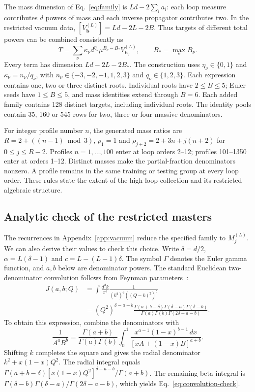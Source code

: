 The mass dimension of Eq.~\eqref{eq:family} is $Ld-2\sum_i a_i$: each loop measure contributes $d$ powers of mass and each inverse propagator contributes two. In the restricted vacuum data, $[V_{\boldsymbol b}^{(L)}]=Ld-2L-2B$. Thus targets of different total powers can be combined consistently as
\begin{equation}
 T=\sum_\nu \kappa_\nu d^{\eta_\nu}\mu^{B_\nu-B_*}
 V_{\boldsymbol b_\nu}^{(L)},\qquad B_*=\max_\nu B_\nu.
 \label{eq:weighted-target}
\end{equation}
Every term has dimension $Ld-2L-2B_*$. The construction uses $\eta_\nu\in\{0,1\}$ and $\kappa_\nu=n_\nu/q_\nu$, with $n_\nu\in\{-3,-2,-1,1,2,3\}$ and $q_\nu\in\{1,2,3\}$. Each expression contains one, two or three distinct roots. Individual roots have $2\leq B\leq5$; Euler seeds have $1\leq B\leq5$, and mass identities extend through $B=6$. Each added family contains 128 distinct targets, including individual roots. The identity pools contain 35, 160 or 545 rows for two, three or four massive denominators.

For integer profile number $n$, the generated mass ratios are $R=2+((n-1)\bmod3)$, $\rho_1=1$ and $\rho_{j+2}=2+3n+j(n+2)$ for $0\leq j\leq R-2$. Profiles $n=1,\ldots,100$ enter at loop orders 2--12; profiles 101--1350 enter at orders 1--12. Distinct masses make the partial-fraction denominators nonzero. A profile remains in the same training or testing group at every loop order. These rules state the extent of the high-loop collection and its restricted algebraic structure.

\subsection{Analytic check of the restricted masters}
The recurrences in Appendix~\ref{app:vacuum} reduce the specified family to $M_j^{(L)}$. We can also derive their values to check this choice. Write $\delta=d/2$, $\alpha=L(\delta-1)$ and $c=L-(L-1)\delta$. The symbol $\Gamma$ denotes the Euler gamma function, and $a,b$ below are denominator powers. The standard Euclidean two-denominator convolution follows from Feynman parameters~\cite{Weinzierl2022}:
\begin{align}
 J(a,b;Q)&=\int\frac{d^dk}{\pi^\delta}
 \frac1{(k^2)^a((Q-k)^2)^b}\nonumber\\
 &=(Q^2)^{\delta-a-b}
 \frac{\Gamma(a+b-\delta)\Gamma(\delta-a)\Gamma(\delta-b)}
 {\Gamma(a)\Gamma(b)\Gamma(2\delta-a-b)}.
 \label{eq:convolution-check}
\end{align}
To obtain this expression, combine the denominators with
\begin{equation}
 \frac1{A^aB^b}=\frac{\Gamma(a+b)}{\Gamma(a)\Gamma(b)}
 \int_0^1\frac{x^{a-1}(1-x)^{b-1}\,dx}{[xA+(1-x)B]^{a+b}}.
\end{equation}
Shifting $k$ completes the square and gives the radial denominator $k^2+x(1-x)Q^2$. The radial integral equals
$\Gamma(a+b-\delta)[x(1-x)Q^2]^{\delta-a-b}/\Gamma(a+b)$.
The remaining beta integral is $\Gamma(\delta-b)\Gamma(\delta-a)/\Gamma(2\delta-a-b)$, which yields Eq.~\eqref{eq:convolution-check}.

